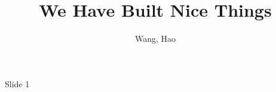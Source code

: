 \documentclass{beamer}
\title{We Have Built Nice Things}
\author{Wang, Hao}
\institute{Lead Engineer @ SunCloud}
\date{}
\begin{document}

\begin{frame}

\titlepage

\end{frame}




\begin{frame}{Slide 1}


\end{frame}
\end{document}
